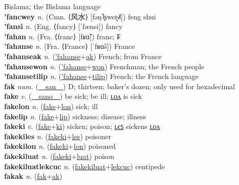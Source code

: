 Bislama; the Bislama language \label{'fanuatutilip} \\
\textbf{'fancwey} \textit{n.} (Cmn. ⟨风水⟩ [fəŋ˥ʂweɪ̯˧˩˥])
feng shui \label{'fancwey} \\
\textbf{'fansi} \textit{n.} (Eng. ⟨fancy⟩ [ˈfænsi])
fancy \label{'fansi} \\
\textbf{'fahan} \textit{n.} (Fra. ⟨franc⟩ [fʁɑ̃])
franc; ₣ \label{'fahan} \\
\textbf{'fahanse} \textit{n.} (Fra. ⟨France⟩ [ˈfʁɑ̃s])
France \label{'fahanse} \\
\textbf{'fahanseak} \textit{n.} (\hyperref['fahanse]{'fahanse}+\hyperref[ak]{ak})
French; from France \label{'fahanseak} \\
\textbf{'fahansewon} \textit{n.} (\hyperref['fahanse]{'fahanse}+\hyperref[won]{won})
Frenchman; the French people \label{'fahansewon} \\
\textbf{'fahansetilip} \textit{n.} (\hyperref['fahanse]{'fahanse}+\hyperref[tilip]{tilip})
French; the French language \label{'fahansetilip} \\
\textbf{fak} \textit{num.} (\hyperref[san]{~~san~~})
D; thirteen; baker’s dozen; only used for hexadecimal \label{fak} \\
\textbf{fake} \textit{v.} (\hyperref[sano]{~~sano~~})
be sick; be ill; \hyperref[fakelon]{ʟᴏᴧ} is sick \label{fake} \\
\textbf{fakelon} \textit{n.} (\hyperref[fake]{fake}+\hyperref[lon]{lon})
sick; ill \label{fakelon} \\
\textbf{fakelip} \textit{n.} (\hyperref[fake]{fake}+\hyperref[lip]{lip})
sickness; disease; illness \label{fakelip} \\
\textbf{fakeki} \textit{v.} (\hyperref[fake]{fake}+\hyperref[ki]{ki})
sicken; poison; \hyperref[fakekiles]{ʟєꜱ} sickens \hyperref[fakekilon]{ʟᴏᴧ} \label{fakeki} \\
\textbf{fakekiles} \textit{n.} (\hyperref[fakeki]{fakeki}+\hyperref[les]{les})
poisoner \label{fakekiles} \\
\textbf{fakekilon} \textit{n.} (\hyperref[fakeki]{fakeki}+\hyperref[lon]{lon})
poisoned \label{fakekilon} \\
\textbf{fakekiluat} \textit{n.} (\hyperref[fakeki]{fakeki}+\hyperref[luat]{luat})
poison \label{fakekiluat} \\
\textbf{fakekiluatlekcuc} \textit{n.} (\hyperref[fakekiluat]{fakekiluat}+\hyperref[lekcuc]{lekcuc})
centipede \label{fakekiluatlekcuc} \\
\textbf{fakak} \textit{n.} (\hyperref[fak]{fak}+\hyperref[ak]{ak})
